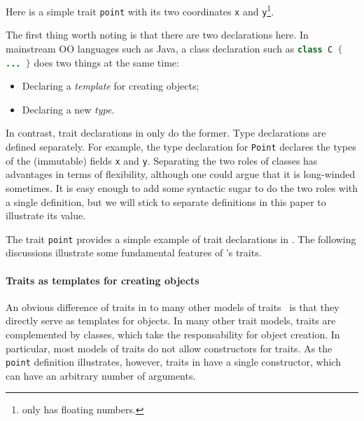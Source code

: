 Here is a simple trait \lstinline{point} with its two coordinates \lstinline{x}
and \lstinline{y}\footnote{\name only has floating numbers.}.


The first thing worth noting is that there are two declarations here.
In mainstream OO languages such as Java, a class declaration such as
\lstinline[language=java]$class C { ... }$ does two things at the same time:

\begin{itemize}
\item Declaring a \textit{template} for creating objects;
\item Declaring a new \textit{type}.
\end{itemize}

In contrast, trait declarations in \name only do the former. Type declarations
are defined separately. For example, the type declaration for \lstinline{Point}
declares the types of the (immutable) fields \lstinline{x} and \lstinline{y}.
Separating the two roles of classes has advantages in terms of flexibility,
although one could argue that it is long-winded sometimes. It is easy enough to
add some syntactic sugar to do the two roles with a single definition, but we
will stick to separate definitions in this paper to illustrate its value.

The trait \lstinline{point} provides a simple example of trait
declarations in \name. The following discussions illustrate 
some fundamental features of \name's traits.

\paragraph{Traits as templates for creating objects} An obvious difference of
traits in \name to many other models of
traits~\cite{scharli2003traits,fisher2004typed,odersky2005scalable} is that they
directly serve as templates for objects. In many other trait models, traits are
complemented by classes, which take the responsability for object creation. In
particular, most models of traits do not allow constructors for traits. As the
\lstinline{point} definition illustrates, however, traits in \name have a single
constructor, which can have an arbitrary number of arguments.

